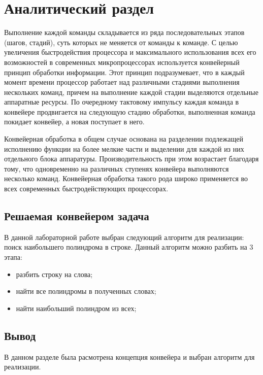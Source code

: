 \chapter{Аналитический раздел}
Выполнение каждой команды складывается из ряда последовательных этапов (шагов, стадий), суть которых не меняется от команды к команде. С целью увеличения быстродействия процессора и максимального использования всех его возможностей в современных микропроцессорах используется конвейерный принцип обработки информации. Этот принцип подразумевает, что в каждый момент времени процессор работает над различными стадиями выполнения нескольких команд, причем на выполнение каждой стадии выделяются отдельные аппаратные ресурсы. По очередному тактовому импульсу каждая команда в конвейере продвигается на следующую стадию обработки, выполненная команда покидает конвейер, а новая поступает в него.

Конвейерная обработка в общем случае основана на разделении подлежащей исполнению функции на более мелкие части и выделении для каждой из них отдельного блока аппаратуры. Производительность при этом возрастает благодаря тому, что одновременно на различных ступенях конвейера выполняются несколько команд. Конвейерная обработка такого рода широко применяется во всех современных быстродействующих процессорах.

\section{Решаемая конвейером задача}
В данной лабораторной работе выбран следующий алгоритм для реализации: поиск наибольшего полиндрома в строке. Данный алгоритм можно разбить на 3 этапа:

\begin{itemize}
	\item разбить строку на слова;
	\item найти все полиндромы в полученных словах;
	\item найти наибольший полиндром из всех;
\end{itemize}


\section{Вывод}

В данном разделе была расмотрена концепция конвейера и выбран алгоритм для реализации.
